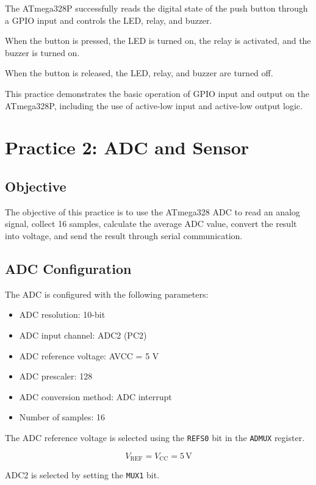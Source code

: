 \documentclass[12pt,a4paper]{article}
\begin{document}
The ATmega328P successfully reads the digital state of the push button
through a GPIO input and controls the LED, relay, and buzzer.

When the button is pressed, the LED is turned on, the relay is
activated, and the buzzer is turned on.

When the button is released, the LED, relay, and buzzer are turned off.

This practice demonstrates the basic operation of GPIO input and
output on the ATmega328P, including the use of active-low input and
active-low output logic.


\section{Practice 2: ADC and Sensor}

\subsection{Objective}

The objective of this practice is to use the ATmega328 ADC to read an analog signal, collect 16 samples, calculate the average ADC value, convert the result into voltage, and send the result through serial communication.

\subsection{ADC Configuration}

The ADC is configured with the following parameters:

\begin{itemize}
    \item ADC resolution: 10-bit
    \item ADC input channel: ADC2 (PC2)
    \item ADC reference voltage: AVCC = 5 V
    \item ADC prescaler: 128
    \item ADC conversion method: ADC interrupt
    \item Number of samples: 16
\end{itemize}

The ADC reference voltage is selected using the \texttt{REFS0} bit in the \texttt{ADMUX} register.

\[
V_{\mathrm{REF}} = V_{\mathrm{CC}} = 5\,\mathrm{V}
\]

ADC2 is selected by setting the \texttt{MUX1} bit.
\end{document}
